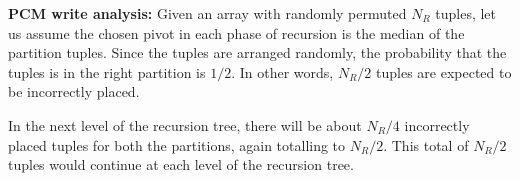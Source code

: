 \begin{comment}
\begin{figure}
\centering
\begin{tikzpicture}[scale=.9, transform shape]

\tikzstyle{every node} = [rectangle, fill=gray!0]

\node (s) at (1,0) {.};
\node (t) at (2,0) {.};
\node (u) at (3,0) {.};
\node (v) at (4,0) {.};
\node (w) at (5,0) {.};
\node (x) at (6,0) {.};
\node (y) at (7,0) {.};
\node (z) at (8,0) {.};

\node (a) at (1.5,1) {$N_R$/8};
\node (b) at (3.5,1) {$N_R$/8};
\node (c) at (5.5,1) {$N_R$/8};
\node (d) at (7.5,1) {$N_R$/8};

\node (e) at (2.5,2) {$N_R$/4};
\node (f) at (6.5,2) {$N_R$/4};

\node (g) at (4.5,3) {$N_R$/2};

\draw[-] (s) -- (a);
\draw[-] (t) -- (a);
\draw[-] (u) -- (b);
\draw[-] (v) -- (b);
\draw[-] (w) -- (c);
\draw[-] (x) -- (c);
\draw[-] (y) -- (d);
\draw[-] (z) -- (d);

\draw[-] (a) -- (e);
\draw[-] (b) -- (e);
\draw[-] (c) -- (f);
\draw[-] (d) -- (f);

\draw[-] (e) -- (g);
\draw[-] (f) -- (g);
\end{tikzpicture} 
\caption{Recursion tree for quicksort swaps}
\label{fig:rec_tree}
\end{figure}
\end{comment}

\textbf{PCM write analysis:} 
Given an array with randomly permuted $N_R$ tuples, let us assume the
chosen pivot in each phase of recursion is the median of the partition
tuples. Since the tuples are arranged randomly, the probability that
the tuples is in the right partition is $1/2$. In other words, $N_R/2$
tuples are expected to be incorrectly placed.

In the next level of the recursion tree, there will be about $N_R/4$
incorrectly placed tuples for both the partitions, again totalling to
$N_R/2$. This total of $N_R/2$ tuples would continue at each level of the
recursion tree. %

